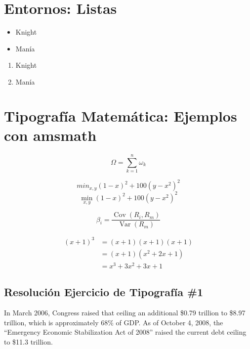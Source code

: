 \documentclass[10pt,a4paper]{article}
\begin{document}
\section*{Entornos: Listas}
\begin{itemize} %
\item Knight
\item Man\'ia
\end{itemize}
\begin{enumerate} %
\item Knight
\item Man\'ia
\end{enumerate}

\section*{Tipografía Matemática: Ejemplos con amsmath}
\begin{equation*}
\Omega = \sum_{k=1}^{n} \omega_k
\end{equation*}

\begin{equation*} %
min_{x,y} (1-x)^2 + 100(y-x^2)^2
\end{equation*}
\begin{equation*} %
\min_{x,y}{(1-x)^2 + 100(y-x^2)^2}
\end{equation*}

\begin{equation*}
\beta_i =
\frac{\operatorname{Cov}(R_i, R_m)}
{\operatorname{Var}(R_m)}
\end{equation*}

\begin{align*}
(x+1)^3 &= (x+1)(x+1)(x+1) \\
&= (x+1)(x^2 + 2x + 1) \\
&= x^3 + 3x^2 + 3x + 1
\end{align*}

\begin{center}
\section*{Resolución Ejercicio de Tipografía \#1}
\end{center}
In March 2006, Congress raised that ceiling an additional \$0.79 trillion to \$8.97 trillion, which is approximately 68\% of GDP. As of October 4, 2008, the ``Emergency Economic Stabilization Act of 2008'' raised the current debt ceiling to \$11.3 trillion.
\\
\\
\end{document}
